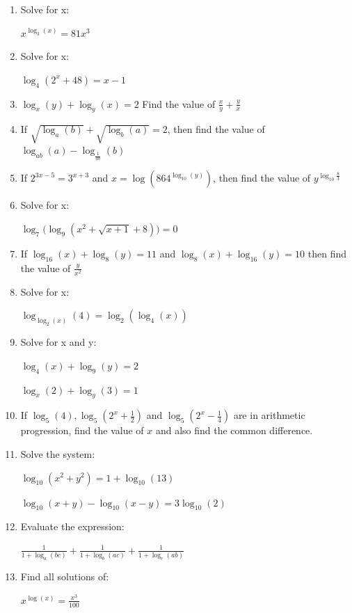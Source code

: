 \documentclass[../main.tex]{subfiles}
\begin{document}
\begin{enumerate}[itemsep=1cm]
    \item Solve for x:
    
    \(x^{\log_3(x)}=81x^3\)
    
    \item Solve for x:
    
    \(\log_4(2^x + 48)=x-1\)

    \item 
    \(\log_x(y)+\log_y(x)=2 \)
    Find the value of \(\frac{x}{y}+\frac{y}{x}\)

    \item 
    If $\sqrt{\log_a(b)}+\sqrt{\log_b(a)}=2$, then find the value of $\log_{ab}(a)-\log_{\frac{1}{ab}}(b)$

    \item 
    If $2^{3x-5}=3^{x+3}$ and $x=\log(864^{\log_{10}(y)})$, then find the value of $y^{\log_{10}\frac{8}{3}}$

    \item 
    Solve for x:

    \(\log_7\bigl(\log_9(x^2+\sqrt{x+1}+8)\bigr)=0\)

    \item 
    If $\log_{16}(x)+\log_8(y)=11$ and $\log_8(x)+\log_{16}(y)=10$ then find the value of $\frac{y}{x^2}$

    \item 
    Solve for x:

    \(\log_{\log_2(x)}(4)=\log_2(\log_4(x)) \)

    \item 
    Solve for x and y:

    \(\log_4(x)+\log_9(y)=2\)

    \(\log_x(2)+\log_y(3)=1\)

    \item 
    If $\log_5(4), \log_5(2^x+\frac{1}{2})$ and $\log_5(2^x-\frac{1}{4})$ are in arithmetic progression, find the value of $x$ and also find the common difference.

    \item 
    Solve the system:

    \(\log_{10}(x^2+y^2)=1+\log_{10}(13)\)

    \(\log_{10}(x+y)-\log_{10}(x-y)=3\log_{10}(2)\)

    \item 
    Evaluate the expression:

    \(\frac{1}{1+\log_a(bc)}+\frac{1}{1+\log_b(ac)}+\frac{1}{1+\log_c(ab)} \)

    \item
    Find all solutions of:
    
    \(x^{\log(x)}=\frac{x^3}{100}\)

\end{enumerate}
\end{document}
